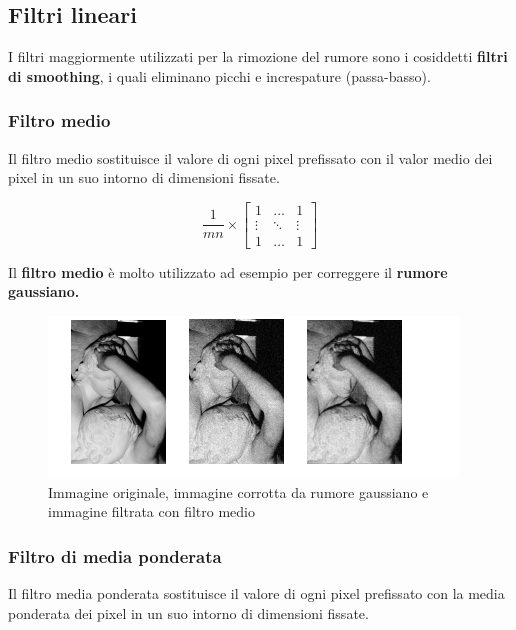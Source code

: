 \subsection{Filtri lineari}

I filtri maggiormente utilizzati per la rimozione del rumore sono i cosiddetti
\textbf{filtri di smoothing}, i quali eliminano picchi e increspature
(passa-basso).

\subsubsection{Filtro medio}
Il filtro medio sostituisce il valore di ogni pixel prefissato con il
valor medio dei pixel in un suo intorno di dimensioni fissate.

\[
    \frac{1}{mn} \times
    \begin{bmatrix}
        1      & \ldots & 1      \\
        \vdots & \ddots & \vdots \\
        1      & \ldots & 1
    \end{bmatrix}
\]

Il \textbf{filtro medio} è molto utilizzato ad esempio per correggere il
\textbf{rumore gaussiano.}

\begin{figure}[H]
    \centering
    \includegraphics[width=\linewidth, keepaspectratio]{capitoli/immagini/imgs/filtro-medio-esempio2.png}
    \caption{Immagine originale, immagine corrotta da rumore gaussiano e immagine filtrata con filtro medio}
\end{figure}

\subsubsection{Filtro di media ponderata}
Il filtro media ponderata sostituisce il valore di ogni pixel prefissato con la media ponderata dei pixel in un suo
intorno di dimensioni fissate.

